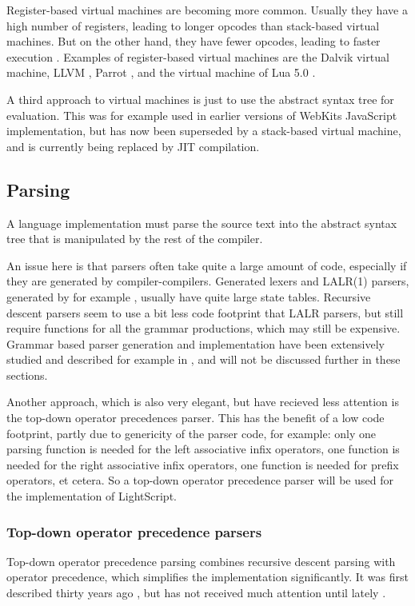 \documentclass[11pt]{report}
\begin{document}
Register-based virtual machines are becoming more common. 
Usually they have a high number of registers, leading to longer opcodes than stack-based virtual machines. But on the other hand, they have fewer opcodes, leading to faster execution \cite{register-vs-stack1, register-vs-stack2}. 
Examples of register-based virtual machines are the Dalvik \cite{dalvik-vm} virtual machine, LLVM \cite{llvm}, Parrot \cite{parrot}, and the virtual machine of Lua 5.0 \cite{luavm}.

A third approach to virtual machines is just to use the abstract syntax tree for evaluation. This was for example used in earlier versions of WebKits JavaScript implementation, but has now been superseded by a stack-based virtual machine, and is currently being replaced by JIT compilation.

\subsection{Parsing}
A language implementation must parse the source text into the abstract syntax tree that is manipulated by the rest of the compiler.

An issue here is that parsers often take quite a large amount of code, especially if they are generated by compiler-compilers.
Generated lexers and LALR(1) parsers, generated by for example \cite{yacc, yacc2}, usually have quite large state tables.
Recursive descent parsers seem to use a bit less code footprint that LALR parsers, but still require functions for all the grammar productions, which may still be expensive.
Grammar based parser generation and implementation have been extensively studied and described for example in  \cite{basics-of-compiler-design, grammar}, and will not be discussed further in these sections.

Another approach, which is also very elegant, 
but have recieved less attention is the
top-down operator precedences parser.
This has the benefit of a low code footprint,
partly due to genericity of the parser code,
for example: only one parsing
function is needed for the left associative infix operators,
one function is needed for the right associative infix operators,
one function is needed for prefix operators, et cetera.
So a top-down operator precedence parser will be used for the implementation of LightScript.


\subsubsection{Top-down operator precedence parsers}
\label{tdop}
Top-down operator precedence parsing combines recursive descent parsing with operator precedence, which simplifies the implementation significantly.
It was first described thirty years ago \cite{top-down-operator-precedence}, but has not received much attention until lately \cite{beautiful-code, crockford-tdop}.
\end{document}
